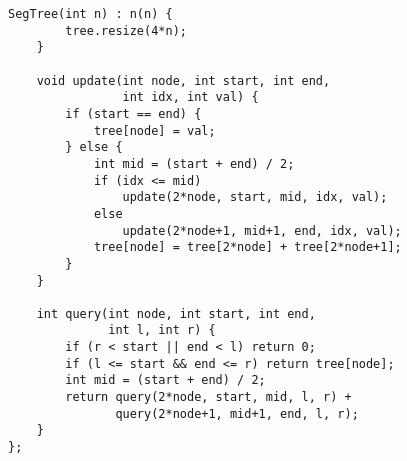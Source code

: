 \documentclass[10pt]{article}
\begin{document}
\begin{landscape}
\begin{multicols}{2}
\begin{lstlisting}[style=cpp]
    SegTree(int n) : n(n) {
        tree.resize(4*n);
    }
    
    void update(int node, int start, int end, 
                int idx, int val) {
        if (start == end) {
            tree[node] = val;
        } else {
            int mid = (start + end) / 2;
            if (idx <= mid)
                update(2*node, start, mid, idx, val);
            else
                update(2*node+1, mid+1, end, idx, val);
            tree[node] = tree[2*node] + tree[2*node+1];
        }
    }
    
    int query(int node, int start, int end, 
              int l, int r) {
        if (r < start || end < l) return 0;
        if (l <= start && end <= r) return tree[node];
        int mid = (start + end) / 2;
        return query(2*node, start, mid, l, r) + 
               query(2*node+1, mid+1, end, l, r);
    }
};
\end{lstlisting}

\end{multicols}
\end{landscape}

\end{document}

